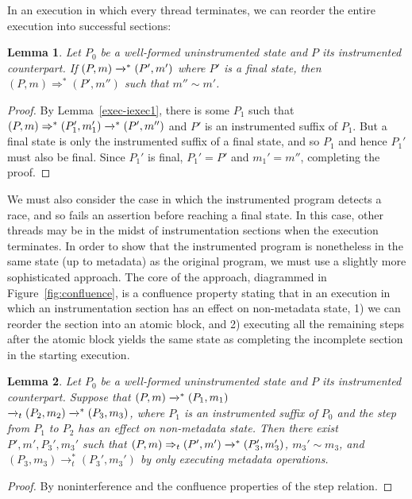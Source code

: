 \documentclass[preprint, 9pt]{sigplanconf}
\newcommand{\cfg}[2]{\ensuremath{(#1, #2)}}
\newcommand{\execstar}[4]{\ensuremath{\cfg{#1}{#2} \tto{#3} #4}}
\newcommand{\iexec}[4]{\ensuremath{\cfg{#1}{#2} \Rightarrow_{#3} #4}}
\newcommand{\execstart}[4]{\ensuremath{\cfg{#1}{#2} \rightarrow^{*}_{#3} #4}}
\newcommand{\execs}[3]{\ensuremath{ \xrightarrow{#2}_{#1} #3}}
\newcommand{\execstars}[2]{\ensuremath{ \tto{#1} #2}}
\newcommand{\iexecstar}[3]{\ensuremath{(#1, #2) \Rightarrow^{*} #3}}
\newcommand{\tto}[1]{\mathrel{
  \vphantom{\xrightarrow{#1}}
  \smash{\xrightarrow{#1}}
  \vphantom{\to}^{*}}
}
\newtheorem{lemma}{Lemma}
\begin{document}
In an execution in which every thread terminates, we can reorder the entire execution into successful sections:
\begin{lemma}\label{exec-iexec}Let $P_0$ be a well-formed uninstrumented state and $P$ its instrumented counterpart. If $\execstar{P}{m}{}{(P', m')}$ where $P'$ is a final state, then $\iexecstar{P}{m}{(P', m'')}$ such that $m'' \sim m'$.\end{lemma}
\begin{proof}By Lemma~\ref{exec-iexec1}, there is some $P_1$ such that $\iexecstar{P}{m}{(P_1', m_1')} \execstars{}{(P', m'')}$ and $P'$ is an instrumented suffix of $P_1$. But a final state is only the instrumented suffix of a final state, and so $P_1$ and hence $P_1'$ must also be final. Since $P_1'$ is final, $P_1' = P'$ and $m_1' = m''$, completing the proof.\end{proof}

We must also consider the case in which the instrumented program detects a race, and so fails an assertion before reaching a final state. In this case, other threads may be in the midst of instrumentation sections when the execution terminates. In order to show that the instrumented program is nonetheless in the same state (up to metadata) as the original program, we must use a slightly more sophisticated approach. The core of the approach, diagrammed in Figure~\ref{fig:confluence}, is a confluence property stating that in an execution in which an instrumentation section has an effect on non-metadata state, 1) we can reorder the section into an atomic block, and 2) executing all the remaining steps after the atomic block yields the same state as completing the incomplete section in the starting execution.
 \begin{lemma}\label{first-effect}Let $P_0$ be a well-formed uninstrumented state and $P$ its instrumented counterpart. Suppose that $\execstar{P}{m}{}{(P_1, m_1)}$\\$\execs{t}{}{(P_2, m_2)} \execstars{}{(P_3, m_3)}$, where $P_1$ is an instrumented suffix of $P_0$ and the step from $P_1$ to $P_2$ has an effect on non-metadata state. Then there exist $P', m', P_3', m_3'$ such that $\iexec{P}{m}{t}{(P', m')} \execstars{}{(P_3', m_3')}$, $m_3' \sim m_3$, and $\execstart{P_3}{m_3}{t}{(P_3', m_3')}$ by only executing metadata operations.\end{lemma}
 \begin{proof}By noninterference and the confluence properties of the step relation.\end{proof}
\end{document}
